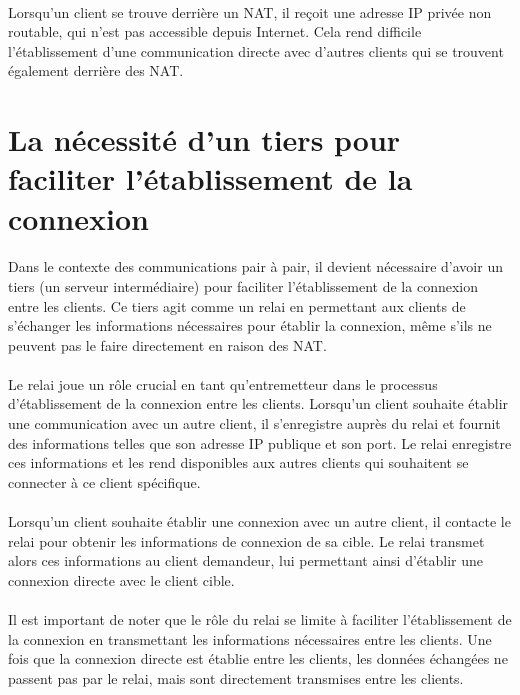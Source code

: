 \paragraph{}
Lorsqu'un client se trouve derrière un NAT, il reçoit une adresse IP privée non routable, qui n'est pas accessible depuis Internet. Cela rend difficile l'établissement 
d'une communication directe avec d'autres clients qui se trouvent également derrière des NAT.

\section{La nécessité d'un tiers pour faciliter l'établissement de la connexion}

\paragraph{}
Dans le contexte des communications pair à pair, il devient nécessaire d'avoir un tiers (un serveur intermédiaire) pour faciliter l'établissement de la connexion entre les clients.
Ce tiers agit comme un relai en permettant aux clients de s'échanger les informations nécessaires pour établir la connexion, même s'ils ne peuvent pas le faire directement en raison des NAT.

\paragraph{}
Le relai joue un rôle crucial en tant qu'entremetteur dans le processus d'établissement de la connexion entre les clients. Lorsqu'un client souhaite établir une communication avec un autre client,
il s'enregistre auprès du relai et fournit des informations telles que son adresse IP publique et son port. Le relai enregistre ces informations et les rend disponibles aux autres clients qui souhaitent
se connecter à ce client spécifique.

\paragraph{}
Lorsqu'un client souhaite établir une connexion avec un autre client, il contacte le relai pour obtenir les informations de connexion de sa cible. Le relai transmet alors ces informations au client
demandeur, lui permettant ainsi d'établir une connexion directe avec le client cible.

\paragraph{}
Il est important de noter que le rôle du relai se limite à faciliter l'établissement de la connexion en transmettant les informations nécessaires entre les clients. Une fois que la connexion directe
est établie entre les clients, les données échangées ne passent pas par le relai, mais sont directement transmises entre les clients.

